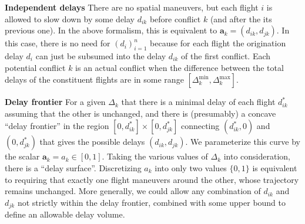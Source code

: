 \documentclass{article}
\begin{document}
\noindent 
\textbf{Independent delays}
There are no spatial maneuvers, but each flight $i$ is allowed to slow down by some delay $d_{ik}$ before conflict $k$ (and after the its previous one).
In the above formalism, this is equivalent to $\mathbf a_k = (d_{ik}, d_{jk})$.
In this case, there is no need for $\left(d_i\right)_{i=1}^n$ because for each flight the origination delay $d_i$ can just be subsumed into the delay $d_{ik}$ of the first conflict.
Each potential conflict $k$ is an actual conflict when the difference between the total delays of the constituent flights are in some range $\left[\Delta_k^{\mathrm{min}}, \Delta_k^{\mathrm{max}}\right]$.

\noindent 
\textbf{Delay frontier}
For a given $\Delta_{k}$ that there is a minimal delay of each flight $d_{ik}^*$ assuming that the other is unchanged, and there is (presumably) a concave ``delay frontier'' in the region $[0, d_{ik}^*] \times [0, d_{jk}^*]$ connecting $(d_{ik}^*, 0)$ and $(0, d_{jk}^*)$ that gives the possible delays $(d_{ik}, d_{jk})$. 
We parameterize this curve by the scalar $\mathbf a_k = a_{k} \in [0, 1]$.
Taking the various values of $\Delta_k$ into consideration, there is a ``delay surface''.
Discretizing $a_k$ into only two values $\{0, 1\}$ is equivalent to requiring that exactly one flight maneuvers around the other, whose trajectory remains unchanged.
More generally, we could allow any combination of $d_{ik}$ and $d_{jk}$ not strictly within the delay frontier, combined with some upper bound to define an allowable delay volume.
\end{document}
